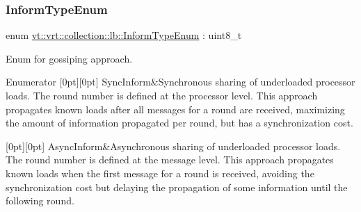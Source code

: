 \subsubsection{\texorpdfstring{Inform\+Type\+Enum}{InformTypeEnum}}
{\footnotesize\ttfamily enum \hyperlink{namespacevt_1_1vrt_1_1collection_1_1lb_a38645ae954fc9b85e4c8f020eb0234aa}{vt\+::vrt\+::collection\+::lb\+::\+Inform\+Type\+Enum} \+: uint8\+\_\+t\hspace{0.3cm}{\ttfamily [strong]}}



Enum for gossiping approach. 

\begin{DoxyEnumFields}{Enumerator}
[0pt][0pt]{}\mbox{\label{namespacevt_1_1vrt_1_1collection_1_1lb_a38645ae954fc9b85e4c8f020eb0234aaa7228d42ce6e32b9d69a58878e39ecfa5}} 
Sync\+Inform&Synchronous sharing of underloaded processor loads. The round number is defined at the processor level. This approach propagates known loads after all messages for a round are received, maximizing the amount of information propagated per round, but has a synchronization cost. \\
\hline

[0pt][0pt]{}\mbox{\label{namespacevt_1_1vrt_1_1collection_1_1lb_a38645ae954fc9b85e4c8f020eb0234aaa1997a66729a2620d0bccf74d06bc402a}} 
Async\+Inform&Asynchronous sharing of underloaded processor loads. The round number is defined at the message level. This approach propagates known loads when the first message for a round is received, avoiding the synchronization cost but delaying the propagation of some information until the following round. \\
\hline

\end{DoxyEnumFields}
\mbox{\label{namespacevt_1_1vrt_1_1collection_1_1lb_a3c71e131f84e2ccbb95f43a1058c749c}} 
